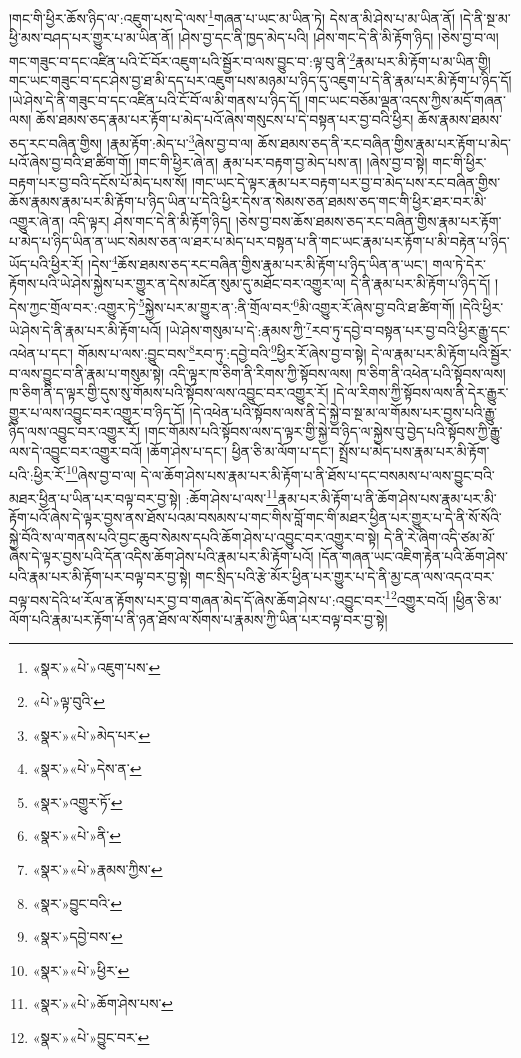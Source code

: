 །གང་གི་ཕྱིར་ཆོས་ཉིད་ལ་:འཇུག་པས་དེ་ལས་\footnote{«སྣར་»«པེ་»འཇུག་པས་}གཞན་པ་ཡང་མ་ཡིན་ཏེ། དེས་ན་མི་ཤེས་པ་མ་ཡིན་ནོ། །དེ་ནི་སྔ་མ་ཕྱི་མས་བཤད་པར་གྱུར་པ་མ་ཡིན་ནོ། །ཤེས་བྱ་དང་ནི་ཁྱད་མེད་པའི། །ཤེས་གང་དེ་ནི་མི་རྟོག་ཉིད། །ཅེས་བྱ་བ་ལ། གང་གཟུང་བ་དང་འཛིན་པའི་ངོ་བོར་འཇུག་པའི་སྦྱོར་བ་ལས་བྱུང་བ་:ལྟ་བུ་ནི་\footnote{«པེ་»ལྟ་བུའི་}རྣམ་པར་མི་རྟོག་པ་མ་ཡིན་གྱི། གང་ཡང་གཟུང་བ་དང་ཤེས་བྱ་ཐ་མི་དད་པར་འཇུག་པས་མཉམ་པ་ཉིད་དུ་འཇུག་པ་དེ་ནི་རྣམ་པར་མི་རྟོག་པ་ཉིད་དོ། །ཡེ་ཤེས་དེ་ནི་གཟུང་བ་དང་འཛིན་པའི་ངོ་བོ་ལ་མི་གནས་པ་ཉིད་དོ། །གང་ཡང་བཅོམ་ལྡན་འདས་ཀྱིས་མདོ་གཞན་ལས། ཆོས་ཐམས་ཅད་རྣམ་པར་རྟོག་པ་མེད་པའོ་ཞེས་གསུངས་པ་དེ་བསྟན་པར་བྱ་བའི་ཕྱིར། ཆོས་རྣམས་ཐམས་ཅད་རང་བཞིན་གྱིས། །རྣམ་རྟོག་:མེད་པ་\footnote{«སྣར་»«པེ་»མེད་པར་}ཞེས་བྱ་བ་ལ། ཆོས་ཐམས་ཅད་ནི་རང་བཞིན་གྱིས་རྣམ་པར་རྟོག་པ་མེད་པའོ་ཞེས་བྱ་བའི་ཐ་ཚིག་གོ། །གང་གི་ཕྱིར་ཞེ་ན། རྣམ་པར་བརྟག་བྱ་མེད་པས་ན། །ཞེས་བྱ་བ་སྟེ། གང་གི་ཕྱིར་བརྟག་པར་བྱ་བའི་དངོས་པོ་མེད་པས་སོ། །གང་ཡང་དེ་ལྟར་རྣམ་པར་བརྟག་པར་བྱ་བ་མེད་པས་རང་བཞིན་གྱིས་ཆོས་རྣམས་རྣམ་པར་མི་རྟོག་པ་ཉིད་ཡིན་པ་དེའི་ཕྱིར་དེས་ན་སེམས་ཅན་ཐམས་ཅད་གང་གི་ཕྱིར་ཐར་བར་མི་འགྱུར་ཞེ་ན། འདི་ལྟར། ཤེས་གང་དེ་ནི་མི་རྟོག་ཉིད། །ཅེས་བྱ་བས་ཆོས་ཐམས་ཅད་རང་བཞིན་གྱིས་རྣམ་པར་རྟོག་པ་མེད་པ་ཉིད་ཡིན་ན་ཡང་སེམས་ཅན་ལ་ཐར་པ་མེད་པར་བསྟན་པ་ནི་གང་ཡང་རྣམ་པར་རྟོག་པ་མི་བརྟེན་པ་ཉིད་ཡོད་པའི་ཕྱིར་རོ། །དེས་\footnote{«སྣར་»«པེ་»དེས་ན་}ཆོས་ཐམས་ཅད་རང་བཞིན་གྱིས་རྣམ་པར་མི་རྟོག་པ་ཉིད་ཡིན་ན་ཡང་། གལ་ཏེ་དེར་རྟོགས་པའི་ཡེ་ཤེས་སྐྱེས་པར་གྱུར་ན་དེས་མངོན་སུམ་དུ་མཐོང་བར་འགྱུར་ལ། དེ་ནི་རྣམ་པར་མི་རྟོག་པ་ཉིད་དོ། །དེས་ཀྱང་གྲོལ་བར་:འགྱུར་ཏེ་\footnote{«སྣར་»འགྱུར་ཏོ་}སྐྱེས་པར་མ་གྱུར་ན་:ནི་གྲོལ་བར་\footnote{«སྣར་»«པེ་»ནི་}མི་འགྱུར་རོ་ཞེས་བྱ་བའི་ཐ་ཚིག་གོ། །དེའི་ཕྱིར་ཡེ་ཤེས་དེ་ནི་རྣམ་པར་མི་རྟོག་པའོ། །ཡེ་ཤེས་གསུམ་པ་དེ་:རྣམས་ཀྱི་\footnote{«སྣར་»«པེ་»རྣམས་ཀྱིས་}རབ་ཏུ་དབྱེ་བ་བསྟན་པར་བྱ་བའི་ཕྱིར་རྒྱུ་དང་འཕེན་པ་དང་། གོམས་པ་ལས་:བྱུང་བས་\footnote{«སྣར་»བྱུང་བའི་}རབ་ཏུ་:དབྱེ་བའི་\footnote{«སྣར་»དབྱེ་བས་}ཕྱིར་རོ་ཞེས་བྱ་བ་སྟེ། དེ་ལ་རྣམ་པར་མི་རྟོག་པའི་སྦྱོར་བ་ལས་བྱུང་བ་ནི་རྣམ་པ་གསུམ་སྟེ། འདི་ལྟར་ཁ་ཅིག་ནི་རིགས་ཀྱི་སྟོབས་ལས། ཁ་ཅིག་ནི་འཕེན་པའི་སྟོབས་ལས། ཁ་ཅིག་ནི་ད་ལྟར་གྱི་དུས་སུ་གོམས་པའི་སྟོབས་ལས་འབྱུང་བར་འགྱུར་རོ། །དེ་ལ་རིགས་ཀྱི་སྟོབས་ལས་ནི་དེར་རྒྱུར་གྱུར་པ་ལས་འབྱུང་བར་འགྱུར་བ་ཉིད་དོ། །དེ་འཕེན་པའི་སྟོབས་ལས་ནི་དེ་སྐྱེ་བ་སྔ་མ་ལ་གོམས་པར་བྱས་པའི་རྒྱུ་ཉིད་ལས་འབྱུང་བར་འགྱུར་རོ། །གང་གོམས་པའི་སྟོབས་ལས་ད་ལྟར་གྱི་སྐྱེ་བ་ཉིད་ལ་སྐྱེས་བུ་བྱེད་པའི་སྟོབས་ཀྱི་རྒྱུ་ལས་དེ་འབྱུང་བར་འགྱུར་བའོ། །ཆོག་ཤེས་པ་དང་། ཕྱིན་ཅི་མ་ལོག་པ་དང་། སྤྲོས་པ་མེད་པས་རྣམ་པར་མི་རྟོག་པའི་:ཕྱིར་རོ་\footnote{«སྣར་»«པེ་»ཕྱིར་}ཞེས་བྱ་བ་ལ། དེ་ལ་ཆོག་ཤེས་པས་རྣམ་པར་མི་རྟོག་པ་ནི་ཐོས་པ་དང་བསམས་པ་ལས་བྱུང་བའི་མཐར་ཕྱིན་པ་ཡིན་པར་བལྟ་བར་བྱ་སྟེ། :ཆོག་ཤེས་པ་ལས་\footnote{«སྣར་»«པེ་»ཆོག་ཤེས་པས་}རྣམ་པར་མི་རྟོག་པ་ནི་ཆོག་ཤེས་པས་རྣམ་པར་མི་རྟོག་པའོ་ཞེས་དེ་ལྟར་བྱས་ནས་ཐོས་པའམ་བསམས་པ་གང་གིས་བློ་གང་གི་མཐར་ཕྱིན་པར་གྱུར་པ་དེ་ནི་སོ་སོའི་སྐྱེ་བོའི་ས་ལ་གནས་པའི་བྱང་ཆུབ་སེམས་དཔའི་ཆོག་ཤེས་པ་འབྱུང་བར་འགྱུར་བ་སྟེ། དེ་ནི་རེ་ཞིག་འདི་ཙམ་མོ་ཞེས་དེ་ལྟར་བྱས་པའི་དོན་འདིས་ཆོག་ཤེས་པའི་རྣམ་པར་མི་རྟོག་པའོ། །དོན་གཞན་ཡང་འཇིག་རྟེན་པའི་ཆོག་ཤེས་པའི་རྣམ་པར་མི་རྟོག་པར་བལྟ་བར་བྱ་སྟེ། གང་སྲིད་པའི་རྩེ་མོར་ཕྱིན་པར་གྱུར་པ་དེ་ནི་མྱ་ངན་ལས་འདའ་བར་བལྟ་བས་དེའི་ཕ་རོལ་ན་རྟོགས་པར་བྱ་བ་གཞན་མེད་དོ་ཞེས་ཆོག་ཤེས་པ་:འབྱུང་བར་\footnote{«སྣར་»«པེ་»བྱུང་བར་}འགྱུར་བའོ། །ཕྱིན་ཅི་མ་ལོག་པའི་རྣམ་པར་རྟོག་པ་ནི་ཉན་ཐོས་ལ་སོགས་པ་རྣམས་ཀྱི་ཡིན་པར་བལྟ་བར་བྱ་སྟེ། 